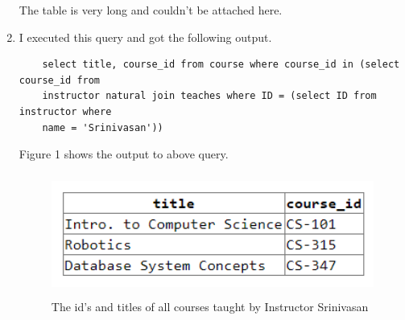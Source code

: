 \documentclass[12pt]{article}
\begin{document}
\begin{enumerate}
The table is very long and couldn't be attached here.

\item I executed this query and got the following output.
\begin{verbatim}
    select title, course_id from course where course_id in (select course_id from
    instructor natural join teaches where ID = (select ID from instructor where
    name = 'Srinivasan'))
\end{verbatim}

Figure 1 shows the output to above query.
\begin{figure}
    \centering
    \includegraphics[width=12cm, height=4cm]{2.b.png}
    \caption{The id’s and titles of all courses taught by Instructor Srinivasan}
\end{figure}
    
\end{enumerate}


\end{document}
